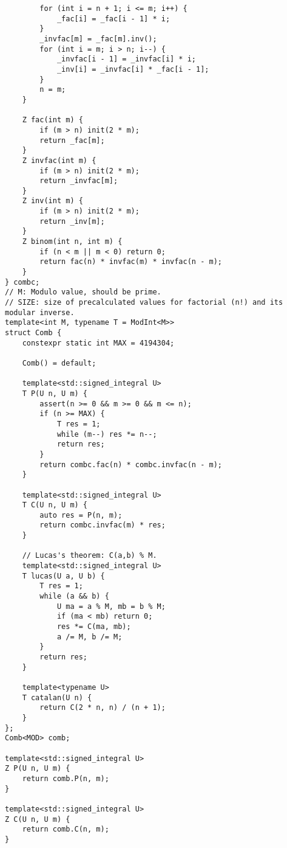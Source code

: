 \documentclass[UTF8]{ctexart}
\begin{document}
\begin{lstlisting}
        for (int i = n + 1; i <= m; i++) {
            _fac[i] = _fac[i - 1] * i;
        }
        _invfac[m] = _fac[m].inv();
        for (int i = m; i > n; i--) {
            _invfac[i - 1] = _invfac[i] * i;
            _inv[i] = _invfac[i] * _fac[i - 1];
        }
        n = m;
    }

    Z fac(int m) {
        if (m > n) init(2 * m);
        return _fac[m];
    }
    Z invfac(int m) {
        if (m > n) init(2 * m);
        return _invfac[m];
    }
    Z inv(int m) {
        if (m > n) init(2 * m);
        return _inv[m];
    }
    Z binom(int n, int m) {
        if (n < m || m < 0) return 0;
        return fac(n) * invfac(m) * invfac(n - m);
    }
} combc;
// M: Modulo value, should be prime.
// SIZE: size of precalculated values for factorial (n!) and its modular inverse.
template<int M, typename T = ModInt<M>>
struct Comb {
    constexpr static int MAX = 4194304;

    Comb() = default;

    template<std::signed_integral U>
    T P(U n, U m) {
        assert(n >= 0 && m >= 0 && m <= n);
        if (n >= MAX) {
            T res = 1;
            while (m--) res *= n--;
            return res;
        }
        return combc.fac(n) * combc.invfac(n - m);
    }

    template<std::signed_integral U>
    T C(U n, U m) {
        auto res = P(n, m);
        return combc.invfac(m) * res;
    }

    // Lucas's theorem: C(a,b) % M.
    template<std::signed_integral U>
    T lucas(U a, U b) {
        T res = 1;
        while (a && b) {
            U ma = a % M, mb = b % M;
            if (ma < mb) return 0;
            res *= C(ma, mb);
            a /= M, b /= M;
        }
        return res;
    }

    template<typename U>
    T catalan(U n) {
        return C(2 * n, n) / (n + 1);
    }
};
Comb<MOD> comb;

template<std::signed_integral U>
Z P(U n, U m) {
    return comb.P(n, m);
}

template<std::signed_integral U>
Z C(U n, U m) {
    return comb.C(n, m);
}
\end{lstlisting}
\end{document}
